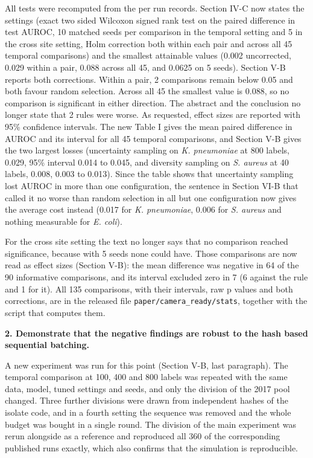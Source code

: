 \documentclass[11pt,a4paper]{article}
\newcommand{\pt}[1]{\textbf{#1}}
\begin{document}
All tests were recomputed from the per run records. Section IV-C now states the settings (exact two sided Wilcoxon
signed rank test on the paired difference in test AUROC, 10 matched seeds per comparison in the temporal setting and 5
in the cross site setting, Holm correction both within each pair and across all 45 temporal comparisons) and the
smallest attainable values (0.002 uncorrected, 0.029 within a pair, 0.088 across all 45, and 0.0625 on 5 seeds). Section
V-B reports both corrections. Within a pair, 2 comparisons remain below 0.05 and both favour random selection. Across
all 45 the smallest value is 0.088, so no comparison is significant in either direction. The abstract and the
conclusion no longer state that 2 rules were worse. As requested, effect sizes are reported with 95\% confidence
intervals. The new Table I gives the mean paired difference in AUROC and its interval for all 45 temporal comparisons,
and Section V-B gives the two largest losses (uncertainty sampling on \textit{K. pneumoniae} at 800 labels, 0.029, 95\%
interval 0.014 to 0.045, and diversity sampling on \textit{S. aureus} at 40 labels, 0.008, 0.003 to 0.013). Since the
table shows that uncertainty sampling lost AUROC in more than one configuration, the sentence in Section VI-B that
called it no worse than random selection in all but one configuration now gives the average cost instead (0.017 for
\textit{K. pneumoniae}, 0.006 for \textit{S. aureus} and nothing measurable for \textit{E. coli}).

For the cross site setting the text no longer says that no comparison reached significance, because with 5 seeds none
could have. Those comparisons are now read as effect sizes (Section V-B): the mean difference was negative in 64 of the
90 informative comparisons, and its interval excluded zero in 7 (6 against the rule and 1 for it). All 135 comparisons, with their intervals, raw p values and both corrections, are in the
released file \texttt{paper/camera\_ready/stats}, together with the script that computes them.

\pt{2. Demonstrate that the negative findings are robust to the hash based sequential batching.}

A new experiment was run for this point (Section V-B, last paragraph). The temporal comparison at 100, 400 and 800
labels was repeated with the same data, model, tuned settings and seeds, and only the division of the 2017 pool
changed. Three further divisions were drawn from independent hashes of the isolate code, and in a fourth setting the
sequence was removed and the whole budget was bought in a single round. The division of the main experiment was rerun
alongside as a reference and reproduced all 360 of the corresponding published runs exactly, which also confirms that
the simulation is reproducible.
\end{document}
